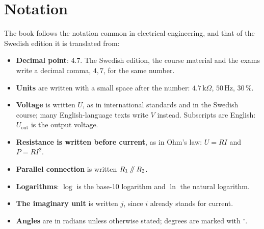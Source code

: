 \section*{Notation}
The book follows the notation common in electrical engineering, and that of the Swedish edition it
is translated from:
\begin{itemize}
  \item \textbf{Decimal point}: $4.7$. The Swedish edition, the course material and the exams
    write a decimal comma, $4{,}7$, for the same number.
  \item \textbf{Units} are written with a small space after the number: $4.7\,\text{k}\Omega$,
    $50\,\text{Hz}$, $30\,\%$.
  \item \textbf{Voltage} is written $U$, as in international standards and in the Swedish course;
    many English-language texts write $V$ instead. Subscripts are English: $U_{\text{out}}$ is
    the output voltage.
  \item \textbf{Resistance is written before current}, as in Ohm's law: $U = RI$ and $P = RI^2$.
  \item \textbf{Parallel connection} is written $R_1 \mathbin{/\mkern-5mu/} R_2$.
  \item \textbf{Logarithms}: $\log$ is the base-10 logarithm and $\ln$ the natural logarithm.
  \item \textbf{The imaginary unit} is written $j$, since $i$ already stands for current.
  \item \textbf{Angles} are in radians unless otherwise stated; degrees are marked with $^{\circ}$.
\end{itemize}
